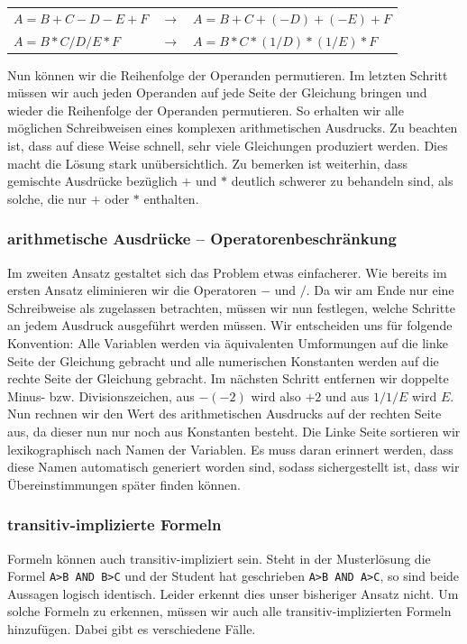 \begin{tabular}{lll}
$A=B+C-D-E+F$ & $\to$ & $A=B+C+(-D)+(-E)+F$\\
$A=B*C/D/E*F$ & $\to$ & $A=B*C*(1/D)*(1/E)*F$\\
\end{tabular}

Nun können wir die Reihenfolge der Operanden permutieren. Im letzten Schritt müssen wir auch jeden Operanden auf jede Seite der Gleichung bringen und wieder die Reihenfolge der Operanden permutieren. So erhalten wir alle möglichen Schreibweisen eines komplexen arithmetischen Ausdrucks. Zu beachten ist, dass auf diese Weise schnell, sehr viele Gleichungen produziert werden. Dies macht die Lösung stark unübersichtlich. Zu bemerken ist weiterhin, dass gemischte Ausdrücke bezüglich $+$ und $*$ deutlich schwerer zu behandeln sind, als solche, die nur $+$ oder $*$ enthalten.

\subsubsection{arithmetische Ausdrücke -- Operatorenbeschränkung}

Im zweiten Ansatz gestaltet sich das Problem etwas einfacherer. Wie bereits im ersten Ansatz eliminieren wir die Operatoren $-$ und $/$. Da wir am Ende nur eine Schreibweise als zugelassen betrachten, müssen wir nun festlegen, welche Schritte an jedem Ausdruck ausgeführt werden müssen. Wir entscheiden uns für folgende Konvention: Alle Variablen werden via äquivalenten Umformungen auf die linke Seite der Gleichung gebracht und alle numerischen Konstanten werden auf die rechte Seite der Gleichung gebracht. Im nächsten Schritt entfernen wir doppelte Minus- bzw. Divisionszeichen, aus $-(-2)$ wird also $+2$ und aus $1/1/E$ wird $E$. Nun rechnen wir den Wert des arithmetischen Ausdrucks auf der rechten Seite aus, da dieser nun nur noch aus Konstanten besteht. Die Linke Seite sortieren wir lexikographisch nach Namen der Variablen. Es muss daran erinnert werden, dass diese Namen automatisch generiert worden sind, sodass sichergestellt ist, dass wir Übereinstimmungen später finden können.


\subsubsection{transitiv-implizierte Formeln}

Formeln können auch transitiv-impliziert sein. Steht in der Musterlösung die Formel \verb|A>B AND B>C| und der Student hat geschrieben \verb|A>B AND A>C|, so sind beide Aussagen logisch identisch. Leider erkennt dies unser bisheriger Ansatz nicht. Um solche Formeln zu erkennen, müssen wir auch alle transitiv-implizierten Formeln hinzufügen. Dabei gibt es verschiedene Fälle. 

